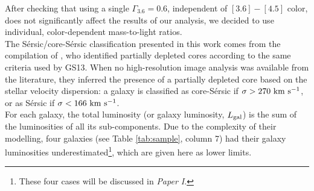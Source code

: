 \documentclass[preprint2]{emulateapj}
\begin{document}
After checking that using a single $\Gamma_{3.6} = 0.6$, independent of $[3.6] - [4.5]$ color, 
does not significantly affect the results of our analysis, 
we decided to use individual, color-dependent mass-to-light ratios. \\
The S\'ersic/core-S\'ersic classification presented in this work 
comes from the compilation of \citet{savorgnangraham2014},
who identified partially depleted cores according to the same criteria used by GS13.
When no high-resolution image analysis was available from the literature, 
they inferred the presence of a partially depleted core based on the stellar velocity dispersion:
a galaxy is classified as core-S\'ersic if $\sigma > 270\rm~km~s^{-1}$,
or as S\'ersic if $\sigma < 166\rm~km~s^{-1}$. \\
For each galaxy, the total luminosity (or galaxy luminosity, $L_{\rm gal}$) is the sum of the luminosities of all its sub-components. 
Due to the complexity of their modelling, 
four galaxies (see Table \ref{tab:sample}, column 7) had their galaxy luminosities 
underestimated\footnote{These four cases will be discussed in \emph{Paper I}.}, 
which are given here as lower limits. 

%
\end{document}
